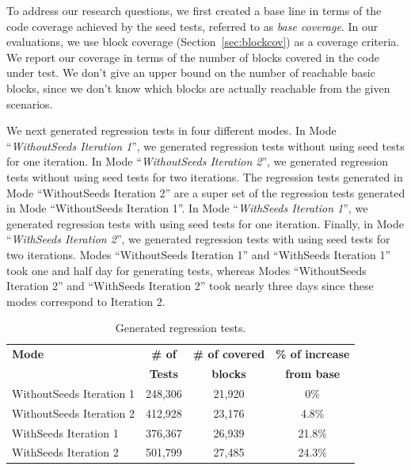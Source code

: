 To address our research questions, we first created a base line in terms of the code coverage achieved by the seed tests, referred to as \emph{base coverage}. In our evaluations, we use block coverage (Section~\ref{sec:blockcov}) as a coverage criteria. We report our coverage in terms of the number of blocks covered in the code under test. We don't give an upper bound on the number of reachable basic blocks, since we don't know which blocks are actually reachable from the given scenarios.

We next generated regression tests in four different modes. In Mode ``\emph{WithoutSeeds Iteration 1}'', we generated regression tests without using seed tests for one iteration. In Mode ``\emph{WithoutSeeds Iteration 2}'', we generated regression tests without using seed tests for two iterations. The regression tests generated in Mode ``WithoutSeeds Iteration 2'' are a super set of the regression tests generated in Mode ``WithoutSeeds Iteration 1''. In Mode ``\emph{WithSeeds Iteration 1}'', we generated regression tests with using seed tests for one iteration. Finally, in Mode ``\emph{WithSeeds Iteration 2}'', we generated regression tests with using seed tests for two iterations. Modes ``WithoutSeeds Iteration 1'' and ``WithSeeds Iteration 1'' took one and half day for generating tests, whereas Modes ``WithoutSeeds Iteration 2'' and ``WithSeeds Iteration 2'' took nearly three days since these modes correspond to Iteration 2.

\setlength{\tabcolsep}{1pt}
\begin{table}[t]
\begin{SmallOut}
\begin{CodeOut}
\begin{center}
\begin {tabular} {|l|c|c|c|}
\hline
\textbf{Mode} & \textbf{\# of} & \textbf{\# of covered} & \textbf{\% of increase}\\  
 & \textbf{Tests} & \textbf{blocks} & \textbf{from base}\\  
\hline
\hline  WithoutSeeds Iteration 1 & 248,306 & 21,920 & 0\%\\
\hline  WithoutSeeds Iteration 2 & 412,928 & 23,176 & 4.8\%\\
\hline  WithSeeds Iteration 1 & 376,367 & 26,939 & 21.8\%\\
\hline  WithSeeds Iteration 2 & 501,799 & 27,485 & 24.3\%\\
\hline
\end{tabular}
\end{center}
\end{CodeOut}
\end{SmallOut}\vspace*{-4ex}
\centering \caption {\label{tab:gentests}Generated regression tests.}
\end{table}

